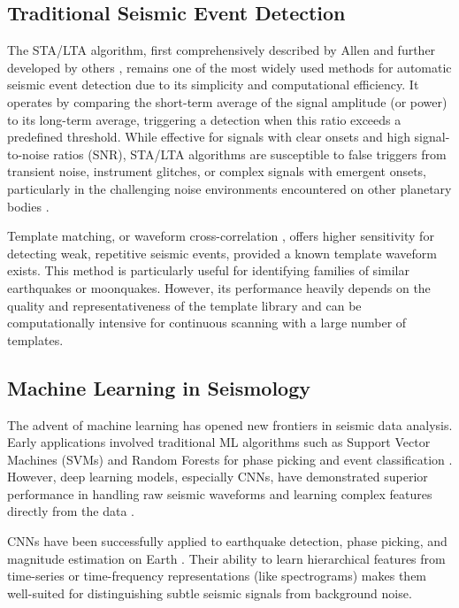 \documentclass[conference]{IEEEtran}
\begin{document}
\subsection{Traditional Seismic Event Detection}
The STA/LTA algorithm, first comprehensively described by Allen \cite{b14} and further developed by others \cite{b26}, remains one of the most widely used methods for automatic seismic event detection due to its simplicity and computational efficiency. It operates by comparing the short-term average of the signal amplitude (or power) to its long-term average, triggering a detection when this ratio exceeds a predefined threshold. While effective for signals with clear onsets and high signal-to-noise ratios (SNR), STA/LTA algorithms are susceptible to false triggers from transient noise, instrument glitches, or complex signals with emergent onsets, particularly in the challenging noise environments encountered on other planetary bodies \cite{b15}.

Template matching, or waveform cross-correlation \cite{b18}, offers higher sensitivity for detecting weak, repetitive seismic events, provided a known template waveform exists. This method is particularly useful for identifying families of similar earthquakes or moonquakes. However, its performance heavily depends on the quality and representativeness of the template library and can be computationally intensive for continuous scanning with a large number of templates.

\subsection{Machine Learning in Seismology}
The advent of machine learning has opened new frontiers in seismic data analysis. Early applications involved traditional ML algorithms such as Support Vector Machines (SVMs) and Random Forests for phase picking and event classification \cite{b19}. However, deep learning models, especially CNNs, have demonstrated superior performance in handling raw seismic waveforms and learning complex features directly from the data \cite{b16}.

CNNs have been successfully applied to earthquake detection, phase picking, and magnitude estimation on Earth \cite{b17, b20}. Their ability to learn hierarchical features from time-series or time-frequency representations (like spectrograms) makes them well-suited for distinguishing subtle seismic signals from background noise.
\end{document}
